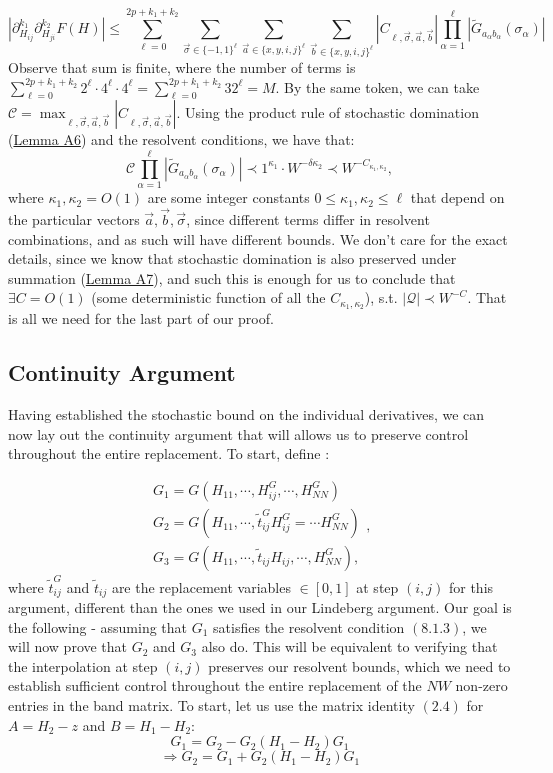 \documentclass[11pt]{article}
\begin{document}
$$\left\vert \partial_{H_{ij}}^{k_1}\partial_{H_{ji}}^{k_2} F(H)\right\vert \leq    \sum_{\ell=0}^{2p+k_1+k_2} \sum_{\vec\sigma\in \{-1,1\}^\ell}\sum_{\vec a\in \{x, y, i, j\}^\ell}\sum_{\vec b\in \{x, y, i, j\}^\ell} |C_{\ell, \vec \sigma, \vec a, \vec b}| \prod_{\alpha=1}^\ell \left\vert \tilde{G}_{a_\alpha b_\alpha}(\sigma_\alpha)\right\vert$$
Observe that sum is finite, where the number of terms is $\sum_{\ell=0}^{2p+k_1+k_2} 2^{\ell}\cdot 4^\ell\cdot 4^\ell = \sum_{\ell=0}^{2p+k_1+k_2}32^\ell=M$. By the same token, we can take $\mathcal{C} = \max_{\ell, \vec\sigma, \vec a, \vec b} |C_{\ell, \vec\sigma, \vec a, \vec b}|$. Using the product rule of stochastic domination (\hyperref[lemma-a6]{Lemma A6}) and the resolvent conditions, we have that: 
$$\mathcal{C}\prod_{\alpha=1}^\ell \left\vert \tilde{G}_{a_\alpha b_\alpha}(\sigma_\alpha)\right\vert \prec 1^{\kappa_1} \cdot W^{-\delta\kappa_2} \prec W^{-C_{\kappa_1,\kappa_2}},$$
 where $\kappa_{1}, \kappa_2=O(1)$ are some integer constants  $0\leq \kappa_1, \kappa_2\leq \ell$ that depend on the particular vectors $\vec a, \vec b, \vec \sigma$, since different terms differ in resolvent combinations, and as such will have different bounds. We don't care for the exact details, since we know that stochastic domination is also preserved under summation (\hyperref[lemma-a7]{Lemma A7}), and such this is enough for us to conclude that $\exists C=O(1)$ (some deterministic function of all the $C_{\kappa_1, \kappa_2}$), s.t. $|\mathcal{Q}|\prec W^{-C}$. That is all we need for the last part of our proof. 

\subsection{Continuity Argument}
\noindent Having established the stochastic bound on the individual derivatives, we can now lay out the continuity argument that will allows us to preserve control throughout the entire replacement. To start, define : 

\begin{equation*}
\begin{array}{c}
G_1 = G\left(H_{11}, \cdots, H_{ij}^G, \cdots, H_{NN}^G\right)\\
G_2 = G\left(H_{11}, \cdots,\tilde{t}_{ij}^G H_{ij}^G=\cdots H_{NN}^G\right) \\
G_3 = G\left(H_{11}, \cdots,\tilde{t}_{ij} H_{ij}, \cdots, H_{NN}^G\right),
\end{array},
\end{equation*}
where $\tilde{t}_{ij}^G$ and $\tilde{t}_{ij}$ are the replacement variables $\in [0, 1]$ at step $(i,j)$ for this argument, different than the ones we used in our Lindeberg argument. Our goal is the following - assuming that $G_1$ satisfies the resolvent condition $(8.1.3)$, we will now prove that $G_2$ and $G_3$ also do. This will be equivalent to verifying that the interpolation at step $(i,j)$ preserves our resolvent bounds, which we need to establish sufficient control throughout the entire replacement of the $NW$ non-zero entries in the band matrix. To start, let us use the matrix identity $(2.4)$ for $A = H_2-z$ and $B = H_1-H_2$:
$$G_1 = G_2 - G_2\left(H_1-H_2\right)G_1$$
$$\Rightarrow G_2 = G_1+G_2\left(H_1-H_2\right)G_1$$
\end{document}
